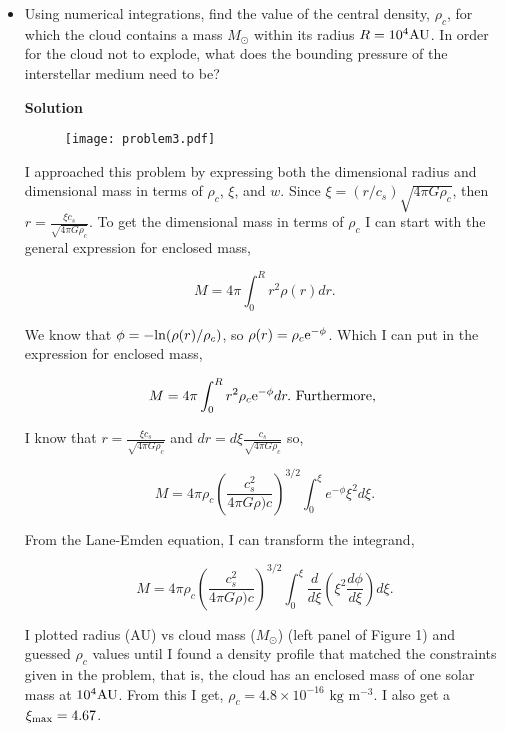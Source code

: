 \documentclass[12pt]{article}
\begin{document}
\begin{itemize}
\item Using numerical integrations, find the value of the central density, $\rho_c$, for which the cloud contains a mass $M_{\odot}$ within its radius $R = 10^4 {\rm AU}$. In order for the cloud not to explode, what does the bounding pressure of the interstellar medium need to be?

{\bf Solution} 

\begin{figure}[h]
\texttt{[image: problem3.pdf]}
\caption{}
\end{figure}

I approached this problem by expressing both the dimensional radius and dimensional mass in terms of $\rho_c$, $\xi$, and $w$. Since $\xi = (r/c_s)\sqrt{4\pi G\rho_c}$, then $r = \frac{\xi c_s}{\sqrt{4\pi G \rho_c}}$. To get the dimensional mass in terms of $\rho_c$ I  can start with the general expression for enclosed mass,

\begin{equation}
M = 4\pi \int_0^R r^2 \rho(r) dr.
\end{equation}

We know that $\phi = -{\rm ln}(\rho(r)/\rho_c)$, so $\rho(r) = \rho_c{\rm e}^{-\phi}$. Which I can put in the expression for enclosed mass, 

\begin{equation}
M = 4\pi \int_0^R r^2  \rho_c{\rm e}^{-\phi} dr. \text{ Furthermore, }
\end{equation}

I know that $r = \frac{\xi c_s}{\sqrt{4\pi G \rho_c}}$ and $dr = d\xi \frac{c_s}{\sqrt{4\pi G \rho_c}}$ so,

\begin{equation}
M = 4\pi\rho_c(\frac{c_s^2}{4\pi G \rho)c})^{3/2} \int_0^\xi e^{-\phi}\xi^2 d\xi.
\end{equation}

From the Lane-Emden equation, I can transform the integrand,

\begin{equation}
M = 4\pi\rho_c(\frac{c_s^2}{4\pi G \rho)c})^{3/2} \int_0^\xi \frac{d}{d\xi} ( \xi^2 \frac{d\phi}{d\xi}) d\xi.
\end{equation}

I plotted radius (AU) vs cloud mass ($M_{\odot}$) (left panel of Figure 1) and guessed $\rho_c$ values until I found a density profile that matched the constraints given in the problem, that is, the cloud has an enclosed mass of one solar mass at $10^4 {\rm AU}$. From this I get, $\rho_c = 4.8 \times 10^{-16} \text{ kg}\text{ m}^{-3}$. I also get a $\xi_{\rm max} = 4.67$.



\end{itemize}
\end{document}
